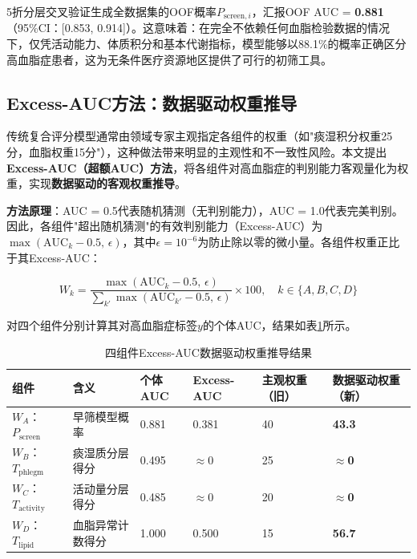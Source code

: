 \documentclass[12pt,a4paper]{ctexart}
\begin{document}
5折分层交叉验证生成全数据集的OOF概率$P_{\text{screen},i}$，汇报OOF AUC = \textbf{0.881}（95\%CI：[0.853, 0.914]）。这意味着：在完全不依赖任何血脂检验数据的情况下，仅凭活动能力、体质积分和基本代谢指标，模型能够以88.1\%的概率正确区分高血脂症患者，这为无条件医疗资源地区提供了可行的初筛工具。

\subsection{Excess-AUC方法：数据驱动权重推导}

传统复合评分模型通常由领域专家主观指定各组件的权重（如"痰湿积分权重25分，血脂权重15分"），这种做法带来明显的主观性和不一致性风险。本文提出\textbf{Excess-AUC（超额AUC）方法}，将各组件对高血脂症的判别能力客观量化为权重，实现\textbf{数据驱动的客观权重推导}。

\textbf{方法原理}：AUC = 0.5代表随机猜测（无判别能力），AUC = 1.0代表完美判别。因此，各组件"超出随机猜测"的有效判别能力（Excess-AUC）为$\max(\text{AUC}_k - 0.5,\, \epsilon)$，其中$\epsilon = 10^{-6}$为防止除以零的微小量。各组件权重正比于其Excess-AUC：

\begin{equation}
W_k = \frac{\max(\text{AUC}_k - 0.5,\, \epsilon)}{\displaystyle\sum_{k'} \max(\text{AUC}_{k'} - 0.5,\, \epsilon)} \times 100, \quad k \in \{A, B, C, D\}
\label{eq:excess_auc}
\end{equation}

对四个组件分别计算其对高血脂症标签$y$的个体AUC，结果如表\ref{tab:weights}所示。

\begin{table}[H]
\centering
\caption{四组件Excess-AUC数据驱动权重推导结果}
\label{tab:weights}
\begin{tabular}{llllll}
\toprule
组件 & 含义 & 个体AUC & Excess-AUC & 主观权重（旧） & 数据驱动权重（新） \\
\midrule
$W_A$：$P_{\text{screen}}$ & 早筛模型概率 & 0.881 & 0.381 & 40 & \textbf{43.3} \\
$W_B$：$T_{\text{phlegm}}$ & 痰湿质分层得分 & 0.495 & $\approx 0$ & 25 & $\approx$\textbf{0} \\
$W_C$：$T_{\text{activity}}$ & 活动量分层得分 & 0.485 & $\approx 0$ & 20 & $\approx$\textbf{0} \\
$W_D$：$T_{\text{lipid}}$ & 血脂异常计数得分 & 1.000 & 0.500 & 15 & \textbf{56.7} \\
\bottomrule
\end{tabular}
\end{table}
\end{document}
